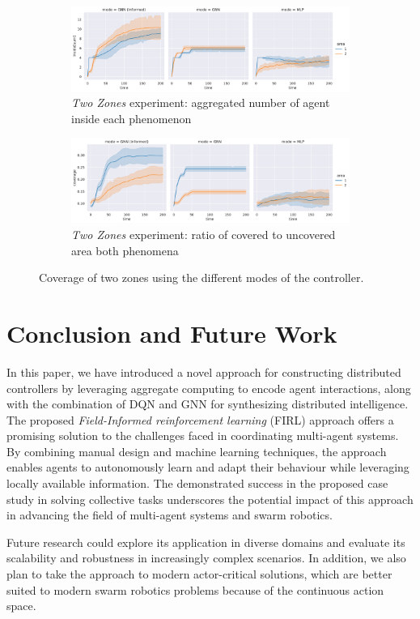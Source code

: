 \documentclass[conference]{IEEEtran}
\begin{document}
\begin{figure}
	\centering
  	\begin{subfigure}[b]{0.85\linewidth}
    \includegraphics[width=\linewidth]{imgs/inside-two-test}
    \caption{\emph{Two Zones} experiment: aggregated number of agent inside each phenomenon}
    \label{fig:inside-two-test}
  \end{subfigure}
  \begin{subfigure}[b]{0.85\linewidth}
    \includegraphics[width=\linewidth]{imgs/coverage-two-test}
    \caption{\emph{Two Zones} experiment: ratio of covered to uncovered area both phenomena}
    \label{fig:coverage-two-test}
  \end{subfigure} 
  \caption{Coverage of two zones using the different modes of the controller.}
  \label{fig:resCoverage}
\end{figure}
 
\section{Conclusion and Future Work}
In this paper, 
 we have introduced a novel approach for constructing distributed controllers by leveraging aggregate computing to encode agent interactions, 
 along with the combination of \ac{DQN} and \ac{GNN} for synthesizing distributed intelligence.
The proposed \emph{Field-Informed reinforcement learning} (FIRL) approach offers a promising solution to the challenges faced in coordinating multi-agent systems. 
By combining manual design and machine learning techniques, 
 the approach enables agents to autonomously learn and adapt their behaviour while leveraging locally available information. 
%
The demonstrated success in the proposed case study in solving collective tasks underscores the potential impact of this approach in advancing the field of multi-agent systems and swarm robotics. 

Future research could explore its application in diverse domains and evaluate its scalability and robustness in increasingly complex scenarios. 
%
In addition, we also plan to take the approach to modern actor-critical solutions, which are better suited to modern swarm robotics problems because of the continuous action space.
\label{sec:conclusion}



\end{document}
